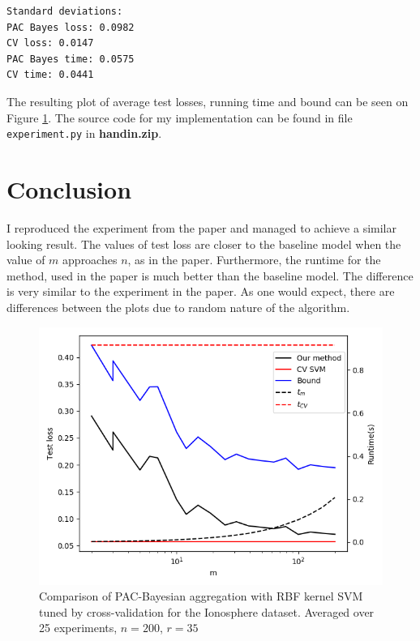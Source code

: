 \documentclass[a4paper]{article}
\begin{document}
\begin{verbatim}
Standard deviations:
PAC Bayes loss: 0.0982
CV loss: 0.0147
PAC Bayes time: 0.0575
CV time: 0.0441
\end{verbatim}
The resulting plot of average test losses,
running time and bound can be seen on Figure \ref{plt1}. The source code for my
implementation can be found in file \texttt{experiment.py} in
\textbf{handin.zip}.

\section{Conclusion}
I reproduced the experiment from the paper and managed to achieve a similar
looking result. The values of test loss are closer to the baseline model when
the value of $m$ approaches $n$, as in the paper. Furthermore, the runtime
for the method, used in the paper is much better than the baseline model. The
difference is very similar to the experiment in the paper.
As one would expect, there are differences between the plots due
to random nature of the algorithm.

\begin{figure}
  \centering
  \includegraphics[width=\textwidth]{code/plt_avg25}
  \caption{Comparison of PAC-Bayesian aggregation with RBF kernel SVM
    tuned by cross-validation for the Ionosphere dataset. Averaged over 25 experiments, $n=200$, $r=35$}
  \label{plt1}
\end{figure}
\end{document}
